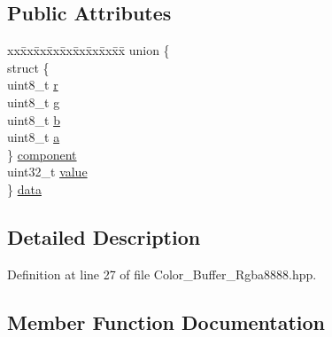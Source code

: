 \subsection*{Public Attributes}
\begin{DoxyCompactItemize}
\item 
\begin{tabbing}
xx\=xx\=xx\=xx\=xx\=xx\=xx\=xx\=xx\=\kill
union \{\\
\>struct \{\\
\>\>uint8\_t \mbox{\hyperlink{structrenderer_1_1_color___buffer___rgba8888_1_1_color_ae45bf688382ca4182db3439b0c21bc55}{r}}\\
\>\>uint8\_t \mbox{\hyperlink{structrenderer_1_1_color___buffer___rgba8888_1_1_color_ac305740da991095868487b26e0effbf8}{g}}\\
\>\>uint8\_t \mbox{\hyperlink{structrenderer_1_1_color___buffer___rgba8888_1_1_color_a917568f3a614e000e50d420572f203a6}{b}}\\
\>\>uint8\_t \mbox{\hyperlink{structrenderer_1_1_color___buffer___rgba8888_1_1_color_ae3ecf9253316911b0b328d5bdfd9a617}{a}}\\
\>\} \mbox{\hyperlink{structrenderer_1_1_color___buffer___rgba8888_1_1_color_aca08e2d59bc41ed9822a83ad2e81dbcc}{component}}\\
\>uint32\_t \mbox{\hyperlink{structrenderer_1_1_color___buffer___rgba8888_1_1_color_a4fdec280433a51b28ebb3199052f8545}{value}}\\
\} \mbox{\hyperlink{structrenderer_1_1_color___buffer___rgba8888_1_1_color_a63791bfca12e18a3c4fe2b4efafbfea7}{data}}\\

\end{tabbing}\end{DoxyCompactItemize}


\subsection{Detailed Description}


Definition at line 27 of file Color\+\_\+\+Buffer\+\_\+\+Rgba8888.\+hpp.



\subsection{Member Function Documentation}
\mbox{\label{structrenderer_1_1_color___buffer___rgba8888_1_1_color_a2a0e64c36743063588aaab03047a5eb2}} 
